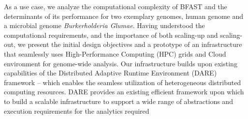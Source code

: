\documentclass{sig-alternate}
\begin{document}

As a use case, we analyze the computational complexity of
BFAST\cite{bfast2009, bfast2009b} and the determinants of its
performance for two exemplary genomes, human genome and a microbial
genome {\it Burkerholderia Glumae}\cite{kim2011}.  Having understood the
computational requirements, and the importance of both scaling-up and
scaling-out, we present the initial design objectives and a prototype
of an infrastructure that seamlessly uses High-Performance Computing
(HPC) grids and Cloud environment for genome-wide analysis.  Our
infrastructure builds upon existing capabilities of the Distributed
Adaptive Runtime Environment (DARE) framework\cite{tg11} -- which
enables the seamless utilization of heterogeneous distributed
computing resources\cite{saga-iccs09,saga-royalsoc,saga-ccgrid10}.  DARE provides an existing efficient framework
upon which to build a scalable infrastructure to support a wide range
of abstractions and execution requirements for the analytics required
\end{document}
